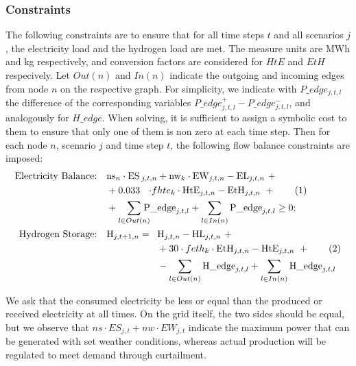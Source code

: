 \documentclass[smallextended,natbib]{svjour3}       %
\numberwithin{theorem}{section}
\begin{document}
\subsubsection{Constraints}
The following constraints are to ensure that for all time steps $t$ and all scenarios $j$, the electricity load and the hydrogen load are met. 
The measure units are MWh and kg respectively, and conversion factors are considered for $HtE$ and $EtH$ respecively.
Let $Out(n)$ and $In(n)$ indicate the outgoing and incoming edges from node $n$ on the respective graph. 
For simplicity, we indicate with $P\_edge_{j,t,l}$ the difference of the corresponding variables $P\_edge^+_{j,t,l}-P\_edge^-_{j,t,l}$, and analogously for $H\_edge$. 
When solving, it is sufficient to assign a symbolic cost to them to ensure that only one of them is non zero at each time step. 
Then for each node $n$, scenario $j$ and time step $t$, the following flow balance constraints are imposed:
\begin{align*}
    \text{Electricity Balance:} \quad & \text{ns}_n \cdot \text{ES}\hspace{-1.2em}&_{j,t,n}&+ \text{nw}_k \cdot \text{EW}_{j,t,n} - \text{EL}_{j,t,n} \ + \\
    &  + 0.033\hspace{-2em}& \cdot f&hte_k \cdot \text{HtE}_{j,t,n} - \text{EtH}_{j,t,n}\ + \stepcounter{equation}\tag{\theequation}\label{constr_P}\\
    & + \sum_{l\in Out(n)}\hspace{-1.9em}&\text{P\_}&\text{edge}_{j,t,l} + \sum_{l\in In(n)} \text{P\_edge}_{j,t,l} \ge 0;\\
    \text{Hydrogen Storage:} \quad & \text{H}_{j,t+1,n} =\hspace{-5em}&& \text{H}_{j,t,n} - \text{HL}_{j,t,n}\ +\\ 
    &&& + 30 \cdot feth_k \cdot \text{EtH}_{j,t,n} - \text{HtE}_{j,t,n} \ + \stepcounter{equation}\tag{\theequation}\label{constr_H}\\
    &&& - \sum_{l\in Out(n)}\text{H\_edge}_{j,t,l} + \sum_{l\in In(n)}\text{H\_edge}_{j,t,l}
\end{align*}

We ask that the consumed electricity be less or equal than the produced or received electricity at all times. 
On the grid itself, the two sides should be equal, but we observe that $ns\cdot ES_{j,t} + nw\cdot EW_{j,t}$ indicate the maximum power that can be generated with set weather conditions, whereas actual production will be regulated to meet demand through curtailment. 
\end{document}
